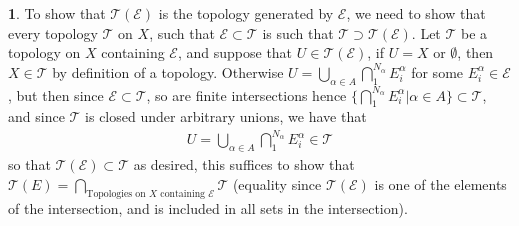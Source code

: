 \documentclass[10.5pt]{article}
\theoremstyle{definition}
\newtheorem{pb}{}
\newcommand{\set}[1]{\{#1\}}
\newcommand{\tor}{\text{ or }}
\begin{document}
\begin{pb}
        To show that \(\mathcal{T}(\mathcal{E})\) is the topology generated by \(\mathcal{E}\), we need to show that every topology \(\mathcal{T}\) on \(X\), such that \(\mathcal{E} \subset \mathcal{T}\) is such that \(\mathcal{T} \supset \mathcal{T}(\mathcal{E})\). Let \(\mathcal{T}\) be a topology on \(X\) containing \(\mathcal{E}\), and suppose that \(U \in \mathcal{T}(\mathcal{E})\), if \(U = X \tor \emptyset\), then \(X \in \mathcal{T}\) by definition of a topology. Otherwise \(U = \bigcup_{\alpha \in A}\bigcap_1^{N_\alpha} E^\alpha_i\) for some \(E^{\alpha}_i \in \mathcal{E}\), but then since \(\mathcal{E} \subset \mathcal{T}\), so are finite intersections hence \(\set{\bigcap_1^{N_\alpha} E^\alpha_i \vert \alpha \in A} \subset \mathcal{T}\), and since \(\mathcal{T}\) is closed under arbitrary unions, we have that
        \begin{align*}
            U = \bigcup_{\alpha \in A} \bigcap_1^{N_\alpha} E^\alpha_i \in \mathcal{T}
        \end{align*}
        so that \(\mathcal{T}(\mathcal{E}) \subset \mathcal{T}\) as desired, this suffices to show that \(\mathcal{T}(E) = \bigcap_{\text{Topologies on }X \text{ containing }\mathcal{E}} \mathcal{T}\) (equality since \(\mathcal{T}(\mathcal{E})\) is one of the elements of the intersection, and is included in all sets in the intersection).
    \end{pb}
\end{document}
